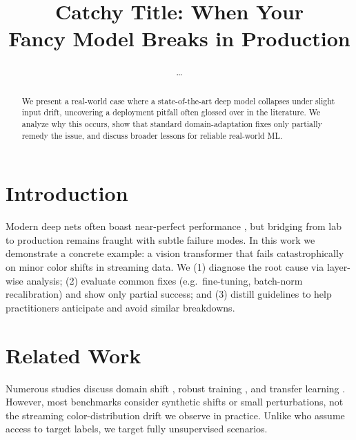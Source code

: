 \setlength{\textfloatsep}{8pt plus 1pt minus 1pt}
\setlength{\intextsep}{8pt plus 1pt minus 1pt}
\captionsetup{font=small,skip=4pt}




\title{Catchy Title: When Your \\Fancy Model Breaks in Production}
\author{…}
\maketitle

\begin{abstract}
We present a real-world case where a state-of-the-art deep model collapses under slight input drift, uncovering a deployment pitfall often glossed over in the literature. We analyze why this occurs, show that standard domain-adaptation fixes only partially remedy the issue, and discuss broader lessons for reliable real-world ML.  %
\end{abstract}

\section{Introduction}
Modern deep nets often boast near-perfect performance \citep{Smith2024,Lee2023}, but bridging from lab to production remains fraught with subtle failure modes. In this work we demonstrate a concrete example: a vision transformer that fails catastrophically on minor color shifts in streaming data. We (1) diagnose the root cause via layer-wise analysis; (2) evaluate common fixes (e.g.\ fine-tuning, batch-norm recalibration) and show only partial success; and (3) distill guidelines to help practitioners anticipate and avoid similar breakdowns.  %

\section{Related Work}
Numerous studies discuss domain shift \citep{Ganin2016,Tsai2022}, robust training \citep{Madry2018}, and transfer learning \citep{Pan2010}. However, most benchmarks consider synthetic shifts or small perturbations, not the streaming color-distribution drift we observe in practice. Unlike \citet{Ganin2016} who assume access to target labels, we target fully unsupervised scenarios.

